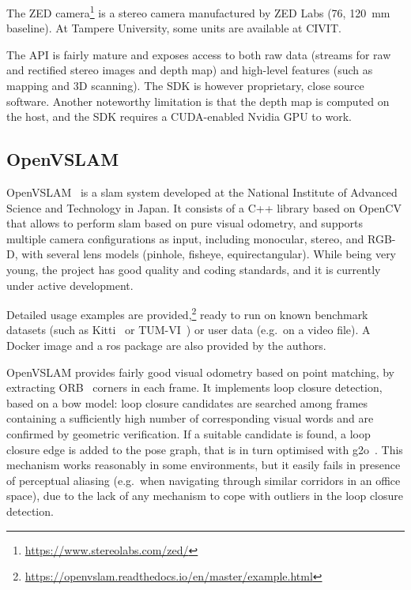\documentclass[11pt, letterpaper, twoside]{article}
\begin{document}
The ZED camera\footnote{\url{https://www.stereolabs.com/zed/}} is a stereo
camera manufactured by ZED Labs (76\textdegree{}\textdegree, 120~mm
baseline). At Tampere University, some units are available at CIVIT.

The API is fairly mature and exposes access to both raw data (streams for raw
and rectified stereo images and depth map) and high-level features (such as
mapping and 3D scanning). The SDK is however proprietary, close source
software. Another noteworthy limitation is that the depth map is computed on
the host, and the SDK requires a CUDA-enabled Nvidia GPU to work.

\subsection{OpenVSLAM}

OpenVSLAM~\cite{openvslam2019} is a \gls{slam} system developed at the National
Institute of Advanced Science and Technology in Japan. It consists of a C++
library based on OpenCV that allows to perform \gls{slam} based on pure visual
odometry, and supports multiple camera configurations as input, including
monocular, stereo, and RGB-D, with several lens models (pinhole, fisheye,
equirectangular). While being very young, the project has good quality and
coding standards, and it is currently under active development.

Detailed usage examples are
provided,\footnote{\url{https://openvslam.readthedocs.io/en/master/example.html}}
ready to run on known benchmark datasets (such as Kitti~\cite{geiger2013vision}
or TUM-VI~\cite{schubert2018vidataset}) or user data (e.g.\ on a video file). A
Docker image and a \gls{ros} package are also provided by the authors.

OpenVSLAM provides fairly good visual odometry based on point matching, by
extracting ORB~\cite{rublee2011orb} corners in each frame. It implements loop
closure detection, based on a \gls{bow} model: loop closure candidates are
searched among frames containing a sufficiently high number of corresponding
visual words and are confirmed by geometric verification. If a suitable
candidate is found, a loop closure edge is added to the pose graph, that is in
turn optimised with g2o~\cite{grisetti2011g2o}. This mechanism works reasonably
in some environments, but it easily fails in presence of perceptual aliasing
(e.g.\ when navigating through similar corridors in an office space), due to
the lack of any mechanism to cope with outliers in the loop closure detection.
\end{document}
